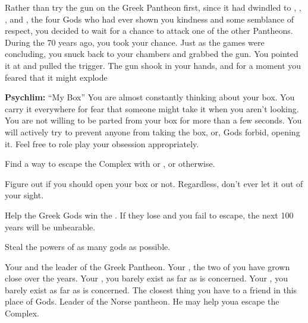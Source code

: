 \documentclass[char]{guardians}
\begin{document}
Rather than try the gun on the Greek Pantheon first, since it had dwindled to \cZeus{}, \cAthena{}, \cHephaestus{}, and \cHera{}, the four Gods who had ever shown you kindness and some semblance of respect, you decided to wait for a chance to attack one of the other Pantheons.  During the \pGames{} 70 years ago, you took your chance. Just as the games were concluding, you snuck back to your chambers and grabbed the gun. You pointed it at \cOsiris{} and pulled the trigger. The gun shook in your hands, and for a moment you feared that it might explode

\begin{itemz}[Notes]
  \item\textbf{Psychlim:} ``My Box'' You are almost constantly thinking about your box. You carry it everywhere for fear that someone might take it when you aren't looking. You are not willing to be parted from your box for more than a few seconds. You will actively try to prevent anyone from taking the box, or, Gods forbid, opening it. Feel free to role play your obsession appropriately.
\end{itemz}

\begin{itemz}[Goals]
  \item Find a way to escape the Complex with \cUnity{} or \cOdin{}, or otherwise.
  \item Figure out if you should open your box or not. Regardless, don't ever let it out of your sight.
  \item Help the Greek Gods win the \pGames{}. If they lose and you fail to escape, the next 100 years will be unbearable.
  \item Steal the powers of as many gods as possible.
\end{itemz}


\begin{contacts}
  \contact{\cZeus{}} Your \cZeus{\parent} and the leader of the Greek Pantheon.
  \contact{\cHera{}} Your \cHera{\parent}, the two of you have grown close over the years.
  \contact{\cAthena{}} Your \cAthena{\sibling}, you barely exist as far as \cAthena{\they} is concerned.
  \contact{\cHephaestus{}} Your \cHephaestus{\sibling}, you barely exist as far as \cHephaestus{\they} is concerned.
  \contact{\cWarden{}} The closest thing you have to a friend in this place of Gods.
  \contact{\cOdin{}} Leader of the Norse pantheon. He may help youa escape the Complex.
\end{contacts}
\end{document}
